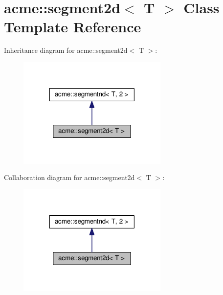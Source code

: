 \hypertarget{classacme_1_1segment2d}{}\section{acme\+:\+:segment2d$<$ T $>$ Class Template Reference}
\label{classacme_1_1segment2d}


Inheritance diagram for acme\+:\+:segment2d$<$ T $>$\+:
\nopagebreak
\begin{figure}[H]
\begin{center}
\leavevmode
\includegraphics[width=210pt]{d6/dbd/classacme_1_1segment2d__inherit__graph}
\end{center}
\end{figure}


Collaboration diagram for acme\+:\+:segment2d$<$ T $>$\+:
\nopagebreak
\begin{figure}[H]
\begin{center}
\leavevmode
\includegraphics[width=210pt]{de/df2/classacme_1_1segment2d__coll__graph}
\end{center}
\end{figure}
